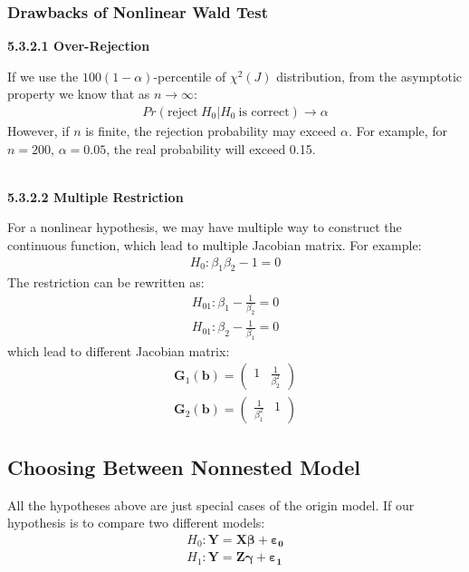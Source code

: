 \documentclass{article}
\begin{document}
\subsubsection{Drawbacks of Nonlinear Wald Test}
\centerline{\textbf{5.3.2.1 Over-Rejection}}
If we use the $100(1 - \alpha)$-percentile of $\chi^2(J)$ distribution, from the asymptotic property we know that as $n \to \infty$:
	\begin{align*}
		Pr(\text{reject}\ H_0 | H_0\ \text{is correct}) \to \alpha
	\end{align*}
However, if $n$ is finite, the rejection probability may exceed $\alpha$. For example, for $n = 200$, $\alpha = 0.05$, the real probability will exceed 0.15.\\\\
\centerline{\textbf{5.3.2.2 Multiple Restriction}}
For a nonlinear hypothesis, we may have multiple way to construct the continuous function, which lead to multiple Jacobian matrix. For example:
	\begin{align*}
		H_0: \beta_1 \beta_2 - 1 = 0
	\end{align*}
The restriction can be rewritten as:
	\begin{align*}
		H_{01}: \beta_1 - \frac{1}{\beta_2} = 0\\
		H_{01}: \beta_2 - \frac{1}{\beta_1} = 0
	\end{align*} 
which lead to different Jacobian matrix:
	\begin{align*}
		\boldsymbol{G}_1(\boldsymbol{b}) = 
		\begin{pmatrix}
			1 & \frac{1}{\beta^2_2}
		\end{pmatrix}\\
		\boldsymbol{G}_2(\boldsymbol{b}) = 
		\begin{pmatrix}
			\frac{1}{\beta^2_1} & 1
		\end{pmatrix}
	\end{align*}


\subsection{Choosing Between Nonnested Model}
All the hypotheses above are just special cases of the origin model. If our hypothesis is to compare two different models:
	\begin{align*}
		H_0: \boldsymbol{Y} = \boldsymbol{X} \boldsymbol{\beta} + \boldsymbol{\varepsilon_0}\\
		H_1: \boldsymbol{Y} = \boldsymbol{Z} \boldsymbol{\gamma} + \boldsymbol{\varepsilon_1}
	\end{align*}
\end{document}

